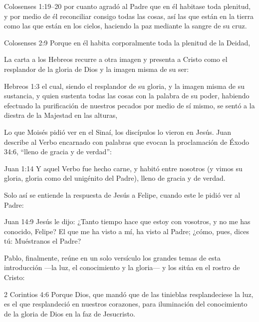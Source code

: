 \begin{verso}{Colosenses 1:19–20}
por cuanto agradó al Padre que en él habitase toda plenitud, y por medio de él reconciliar consigo todas las cosas, así las que están en la tierra como las que están en los cielos, haciendo la paz mediante la sangre de su cruz.
\end{verso}

\begin{verso}{Colosenses 2:9}
Porque en él habita corporalmente toda la plenitud de la Deidad,
\end{verso}

La carta a los Hebreos recurre a otra imagen y presenta a Cristo como el resplandor de la gloria de Dios y la imagen misma de su ser:

\begin{verso}{Hebreos 1:3}
el cual, siendo el resplandor de su gloria, y la imagen misma de su sustancia, y quien sustenta todas las cosas con la palabra de su poder, habiendo efectuado la purificación de nuestros pecados por medio de sí mismo, se sentó a la diestra de la Majestad en las alturas,
\end{verso}

Lo que Moisés pidió ver en el Sinaí, los discípulos lo vieron en Jesús. Juan describe al Verbo encarnado con palabras que evocan la proclamación de Éxodo 34:6, “lleno de gracia y de verdad”:

\begin{verso}{Juan 1:14}
Y aquel Verbo fue hecho carne, y habitó entre nosotros (y vimos su gloria, gloria como del unigénito del Padre), lleno de gracia y de verdad.
\end{verso}

Solo así se entiende la respuesta de Jesús a Felipe, cuando este le pidió ver al Padre:

\begin{verso}{Juan 14:9}
Jesús le dijo: ¿Tanto tiempo hace que estoy con vosotros, y no me has conocido, Felipe? El que me ha visto a mí, ha visto al Padre; ¿cómo, pues, dices tú: Muéstranos el Padre?
\end{verso}

Pablo, finalmente, reúne en un solo versículo los grandes temas de esta introducción —la luz, el conocimiento y la gloria— y los sitúa en el rostro de Cristo:

\begin{verso}{2 Corintios 4:6}
Porque Dios, que mandó que de las tinieblas resplandeciese la luz, es el que resplandeció en nuestros corazones, para iluminación del conocimiento de la gloria de Dios en la faz de Jesucristo.
\end{verso}


